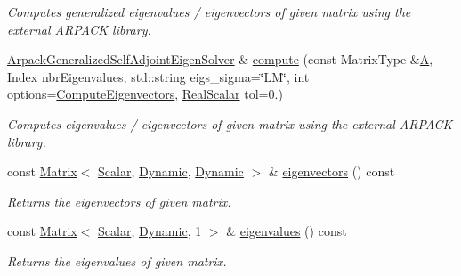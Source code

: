 \begin{DoxyCompactItemize}
\begin{DoxyCompactList}\small\item\em Computes generalized eigenvalues / eigenvectors of given matrix using the external A\+R\+P\+A\+CK library. \end{DoxyCompactList}\item 
\hyperlink{class_eigen_1_1_arpack_generalized_self_adjoint_eigen_solver}{Arpack\+Generalized\+Self\+Adjoint\+Eigen\+Solver} \& \hyperlink{class_eigen_1_1_arpack_generalized_self_adjoint_eigen_solver_a781369cb32c8e4623894da79909612c4}{compute} (const Matrix\+Type \&\hyperlink{group___core___module_class_eigen_1_1_matrix}{A}, Index nbr\+Eigenvalues, std\+::string eigs\+\_\+sigma=\char`\"{}LM\char`\"{}, int options=\hyperlink{group__enums_ggae3e239fb70022eb8747994cf5d68b4a9ada93d8885bde32b876ba4af01d3292cc}{Compute\+Eigenvectors}, \hyperlink{class_eigen_1_1_arpack_generalized_self_adjoint_eigen_solver_a2555af55e53bf9de894a49e639be2e1e}{Real\+Scalar} tol=0.)
\begin{DoxyCompactList}\small\item\em Computes eigenvalues / eigenvectors of given matrix using the external A\+R\+P\+A\+CK library. \end{DoxyCompactList}\item 
const \hyperlink{group___core___module_class_eigen_1_1_matrix}{Matrix}$<$ \hyperlink{class_eigen_1_1_arpack_generalized_self_adjoint_eigen_solver_ab1182405bfe87a505d4b7a8311c661ec}{Scalar}, \hyperlink{namespace_eigen_ad81fa7195215a0ce30017dfac309f0b2}{Dynamic}, \hyperlink{namespace_eigen_ad81fa7195215a0ce30017dfac309f0b2}{Dynamic} $>$ \& \hyperlink{class_eigen_1_1_arpack_generalized_self_adjoint_eigen_solver_a183825135568364792a955efc55a0773}{eigenvectors} () const
\begin{DoxyCompactList}\small\item\em Returns the eigenvectors of given matrix. \end{DoxyCompactList}\item 
const \hyperlink{group___core___module_class_eigen_1_1_matrix}{Matrix}$<$ \hyperlink{class_eigen_1_1_arpack_generalized_self_adjoint_eigen_solver_ab1182405bfe87a505d4b7a8311c661ec}{Scalar}, \hyperlink{namespace_eigen_ad81fa7195215a0ce30017dfac309f0b2}{Dynamic}, 1 $>$ \& \hyperlink{class_eigen_1_1_arpack_generalized_self_adjoint_eigen_solver_ab46900dafdd11a8ac05a662c6b41480d}{eigenvalues} () const
\begin{DoxyCompactList}\small\item\em Returns the eigenvalues of given matrix. \end{DoxyCompactList}\item 

\end{DoxyCompactItemize}
